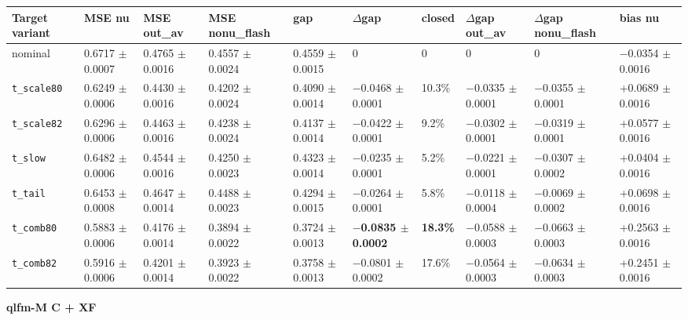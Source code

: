 \documentclass[10pt,a4paper]{article}
\begin{document}
\begin{center}\scriptsize
\setlength{\tabcolsep}{3pt}\renewcommand{\arraystretch}{1.15}
\begin{tabularx}{\linewidth}{LLLLLLLLLL}
\toprule
\textbf{Target variant} & \textbf{MSE nu} & \textbf{MSE out\_av} & \textbf{MSE nonu\_flash} & \textbf{gap} & \textbf{$\Delta$gap} & \textbf{closed} & \textbf{$\Delta$gap out\_av} & \textbf{$\Delta$gap nonu\_flash} & \textbf{bias nu} \\
\midrule
nominal & 0.6717 $\pm$ 0.0007 & 0.4765 $\pm$ 0.0016 & 0.4557 $\pm$ 0.0024 & 0.4559 $\pm$ 0.0015 & 0 & 0 & 0 & 0 & $-$0.0354 $\pm$ 0.0016 \\
\texttt{t\_\allowbreak{}scale80} & 0.6249 $\pm$ 0.0006 & 0.4430 $\pm$ 0.0016 & 0.4202 $\pm$ 0.0024 & 0.4090 $\pm$ 0.0014 & $-$0.0468 $\pm$ 0.0001 & 10.3\% & $-$0.0335 $\pm$ 0.0001 & $-$0.0355 $\pm$ 0.0001 & +0.0689 $\pm$ 0.0016 \\
\texttt{t\_\allowbreak{}scale82} & 0.6296 $\pm$ 0.0006 & 0.4463 $\pm$ 0.0016 & 0.4238 $\pm$ 0.0024 & 0.4137 $\pm$ 0.0014 & $-$0.0422 $\pm$ 0.0001 & 9.2\% & $-$0.0302 $\pm$ 0.0001 & $-$0.0319 $\pm$ 0.0001 & +0.0577 $\pm$ 0.0016 \\
\texttt{t\_\allowbreak{}slow} & 0.6482 $\pm$ 0.0006 & 0.4544 $\pm$ 0.0016 & 0.4250 $\pm$ 0.0023 & 0.4323 $\pm$ 0.0014 & $-$0.0235 $\pm$ 0.0001 & 5.2\% & $-$0.0221 $\pm$ 0.0001 & $-$0.0307 $\pm$ 0.0002 & +0.0404 $\pm$ 0.0016 \\
\texttt{t\_\allowbreak{}tail} & 0.6453 $\pm$ 0.0008 & 0.4647 $\pm$ 0.0014 & 0.4488 $\pm$ 0.0023 & 0.4294 $\pm$ 0.0015 & $-$0.0264 $\pm$ 0.0001 & 5.8\% & $-$0.0118 $\pm$ 0.0004 & $-$0.0069 $\pm$ 0.0002 & +0.0698 $\pm$ 0.0016 \\
\texttt{t\_\allowbreak{}comb80} & 0.5883 $\pm$ 0.0006 & 0.4176 $\pm$ 0.0014 & 0.3894 $\pm$ 0.0022 & 0.3724 $\pm$ 0.0013 & \textbf{$-$0.0835 $\pm$ 0.0002} & \textbf{18.3\%} & $-$0.0588 $\pm$ 0.0003 & $-$0.0663 $\pm$ 0.0003 & +0.2563 $\pm$ 0.0016 \\
\texttt{t\_\allowbreak{}comb82} & 0.5916 $\pm$ 0.0006 & 0.4201 $\pm$ 0.0014 & 0.3923 $\pm$ 0.0022 & 0.3758 $\pm$ 0.0013 & $-$0.0801 $\pm$ 0.0002 & 17.6\% & $-$0.0564 $\pm$ 0.0003 & $-$0.0634 $\pm$ 0.0003 & +0.2451 $\pm$ 0.0016 \\
\bottomrule
\end{tabularx}
\end{center}
\textbf{qlfm-M C + XF}
\end{document}

